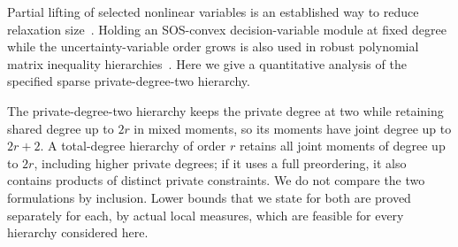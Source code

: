 Partial lifting of selected nonlinear variables is an established way to
reduce relaxation size~\cite{kahl2005-globally-optimal-estimates}. Holding
an SOS-convex decision-variable module at fixed degree while the
uncertainty-variable order grows is also used in robust polynomial matrix
inequality hierarchies~\cite{wang2025-a-moment-sum-of-squares}. Here we give
a quantitative analysis of the specified sparse private-degree-two hierarchy.

The private-degree-two hierarchy keeps the private degree at two while
retaining shared degree up to $2r$ in mixed moments, so its moments have
joint degree up to $2r+2$. A total-degree hierarchy of order $r$ retains all
joint moments of degree up to $2r$, including higher private degrees; if it
uses a full preordering, it also contains products of distinct private
constraints. We do not compare the two formulations by inclusion. Lower
bounds that we state for both are proved separately for each, by actual
local measures, which are feasible for every hierarchy considered here.
